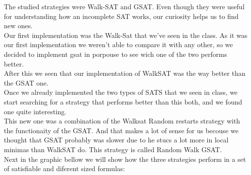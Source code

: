 
The studied strategies were Walk-SAT and GSAT. Even though they were useful for understanding how an incomplete SAT works, our curiosity helps us to find new ones.\\
Our first implementation was the Walk-Sat that we've seen in the class. As it was our first implementation we weren't able to compare it with any other, so we decided to implement gsat in porpouse to see wich one of the two performs better.\\
After this we seen that our implementation of WalkSAT was the way better than the GSAT one.\\
Once we already implemented the two types of SATS that we seen in class, we start searching for a strategy that performs better than this both, and we found one quite interesting.\\
This new one was a combination of the Walksat Random restarts strategy with the functionaity of the GSAT. And that makes a lot of sense for us becouse we thought that GSAT probably was slower due to he stucs a lot more in local minimas than WalkSAT do. This strategy is called Random Walk GSAT.\\
Next in the graphic bellow we will show how the three strategies perform in a set of satisfiable and diferent sized formulas:

